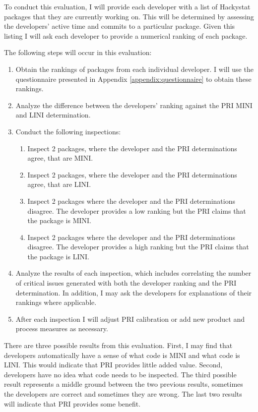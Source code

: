 To conduct this evaluation, I will provide each developer with a list of
Hackystat packages that they are currently working on. This will be
determined by assessing the developers' active time and commits to a
particular package. Given this listing I will ask each developer to provide
a numerical ranking of each package.

The following steps will occur in this evaluation:
\begin{enumerate}
\item Obtain the rankings of packages from each individual developer. I
  will use the questionnaire presented in Appendix
  \ref{appendix:questionnaire} to obtain these rankings.
\item Analyze the difference between the developers' ranking against the
  PRI MINI and LINI determination.
\item Conduct the following inspections: 
\begin{enumerate}
\item Inspect 2 packages, where the developer and the PRI determinations
  agree, that are MINI.
\item Inspect 2 packages, where the developer and the PRI determinations
  agree, that are LINI.
\item Inspect 2 packages where the developer and the PRI determinations
  disagree. The developer provides a low ranking but the PRI claims that
  the package is MINI.
\item Inspect 2 packages where the developer and the PRI determinations
  disagree. The developer provides a high ranking but the PRI claims that
  the package is LINI.
\end{enumerate}
\item Analyze the results of each inspection, which includes correlating
  the number of critical issues generated with both the developer ranking
  and the PRI determination. In addition, I may ask the developers for
  explanations of their rankings where applicable.
\item After each inspection I will adjust PRI calibration or add new
  product and process measures as necessary.
\end{enumerate}

There are three possible results from this evaluation. First, I may find
that developers automatically have a sense of what code is MINI and what
code is LINI. This would indicate that PRI provides little added value.
Second, developers have no idea what code needs to be inspected. The third
possible result represents a middle ground between the two previous
results, sometimes the developers are correct and sometimes they are wrong.
The last two results will indicate that PRI provides some benefit.


